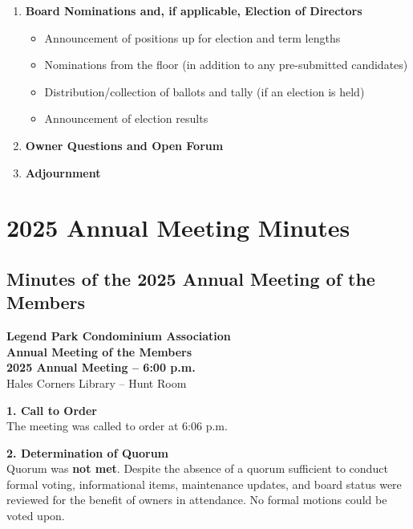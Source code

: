 \documentclass[11pt]{article}
\newcommand{\strong}[1]{\textbf{#1}}
\begin{document}
\begin{enumerate}[leftmargin=1.4em]
    \item \strong{Board Nominations and, if applicable, Election of Directors}
    \begin{itemize}[leftmargin=1.1em]
        \item Announcement of positions up for election and term lengths
        \item Nominations from the floor (in addition to any pre-submitted candidates)
        \item Distribution/collection of ballots and tally (if an election is held)
        \item Announcement of election results
    \end{itemize}

    \item \strong{Owner Questions and Open Forum}

    \item \strong{Adjournment}
\end{enumerate}

\newpage

\section{2025 Annual Meeting Minutes}

\subsection*{Minutes of the 2025 Annual Meeting of the Members}
\vspace{-0.6em}

\noindent
\textbf{Legend Park Condominium Association}\\
\textbf{Annual Meeting of the Members}\\
\textbf{2025 Annual Meeting -- 6{:}00 p.m.}\\
Hales Corners Library -- Hunt Room

\vspace{1em}

\noindent
\strong{1. Call to Order}\\[0.5em]
The meeting was called to order at 6{:}06 p.m.

\vspace{0.75em}

\noindent
\strong{2. Determination of Quorum}\\[0.5em]
Quorum was \textbf{not met}. Despite the absence of a quorum sufficient to conduct formal
voting, informational items, maintenance updates, and board status were reviewed for the
benefit of owners in attendance. No formal motions could be voted upon.
\end{document}
